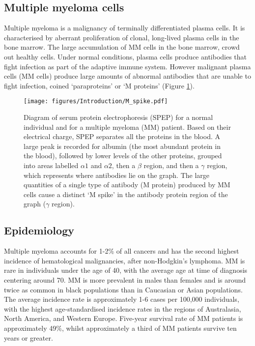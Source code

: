 \subsection{Multiple myeloma cells}
Multiple myeloma is a malignancy of terminally differentiated plasma cells.
It is characterised by aberrant proliferation of clonal, long-lived plasma cells in the bone marrow\cite{anderson2011pathogenesis}.
The large accumulation of MM cells in the bone marrow, crowd out healthy cells.
Under normal conditions, plasma cells produce antibodies that fight infection as part of the adaptive immune system.
However malignant plasma cells (MM cells) produce large amounts of abnormal antibodies that are unable to fight infection, coined `paraproteins' or `M proteins' (Figure \ref{fig:m_spike}).

\begin{figure}[htb]
\centering
\texttt{[image: figures/Introduction/M\_spike.pdf]}
\caption[M spike diagram]{Diagram of serum protein electrophoresis (SPEP) for a normal individual and for a multiple myeloma (MM) patient.
Based on their electrical charge, SPEP separates all the proteins in the blood.
A large peak is recorded for albumin (the most abundant protein in the blood), followed by lower levels of the other proteins, grouped into areas labelled $\alpha1$ and $\alpha2$, then a $\beta$ region, and then a $\gamma$ region, which represents where antibodies lie on the graph.
The large quantities of a single type of antibody (M protein) produced by MM cells cause a distinct `M spike' in the antibody protein region of the graph ($\gamma$ region).}
\label{fig:m_spike}
\end{figure}

\subsection{Epidemiology}
Multiple myeloma accounts for 1-2\% of all cancers and has the second highest incidence of hematological malignancies, after non-Hodgkin's lymphoma\cite{international2003criteria}.
MM is rare in individuals under the age of 40, with the average age at time of diagnosis centering around 70\cite{tsang2019multiple, palumbo2011multiple}.
MM is more prevalent in males than females and is around twice as common in black populations than in Caucasian or Asian populations\cite{nhsmyeloma}.
The average incidence rate is approximately 1-6 cases per 100,000 individuals\cite{tsang2019multiple, palumbo2011multiple, teras20162016}, with the highest age-standardised incidence rates in the regions of Australasia, North America, and Western Europe\cite{cowan2018global}.
Five-year survival rate of MM patients is approximately 49\%, whilst approximately a third of MM patients survive ten years or greater\cite{cancerresearchuk, siegel2016cancer}.

